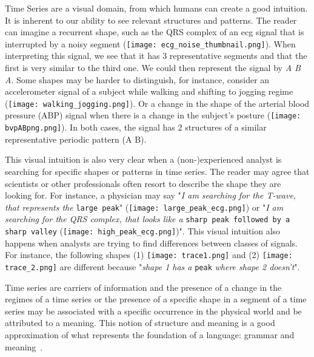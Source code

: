 Time Series are a visual domain, from which humans can create a good intuition. It is inherent to our ability to see relevant structures and patterns. The reader can imagine a recurrent shape, such as the \textcolor{myblue}{QRS complex} of an \gls{ecg} signal that is interrupted by a \textcolor{myred}{noisy} segment (\texttt{[image: ecg\_noise\_thumbnail.png]}). When interpreting this signal, we see that it has 3 representative segments and that the first is very similar to the third one. We could then represent the signal by \textit{\textcolor{myblue}{A} \textcolor{myred}{B} \textcolor{myblue}{A}}. Some shapes may be harder to distinguish, for instance, consider an accelerometer signal of a subject while \textcolor{myblue}{walking} and shifting to \textcolor{mygreen}{jogging} regime (\texttt{[image: walking\_jogging.png]}). Or a change in the shape of the arterial blood pressure (ABP) signal when there is a change in the subject's posture (\texttt{[image: bvpABpng.png]}). In both cases, the signal has 2 structures of a similar representative periodic pattern (\textcolor{myblue}{A} \textcolor{mygreen}{B}).

This visual intuition is also very clear when a (non-)experienced analyst is searching for specific shapes or patterns in time series. The reader may agree that scientists or other professionals often resort to describe the shape they are looking for. For instance, a physician may say "\textit{I am searching for the T-wave, that represents the} \texttt{large peak}" (\texttt{[image: large\_peak\_ecg.png]}) or "\textit{I am searching for the QRS complex, that looks like a} \texttt{sharp peak followed by a sharp valley} (\texttt{[image: high\_peak\_ecg.png]})". This visual intuition also happens when analysts are trying to find differences between classes of signals. For instance, the following shapes (1) \texttt{[image: trace1.png]} and (2) \texttt{[image: trace\_2.png]} are different because "\textit{shape 1 has a} \texttt{peak} \textit{where shape 2 doesn't}". 

Time series are carriers of information and the presence of a change in the regimes of a time series or the presence of a specific shape in a segment of a time series may be associated with a specific occurrence in the physical world and be attributed to a meaning. This notion of structure and meaning is a good approximation of what represents the foundation of a language: grammar and meaning~\cite{grammar}.

